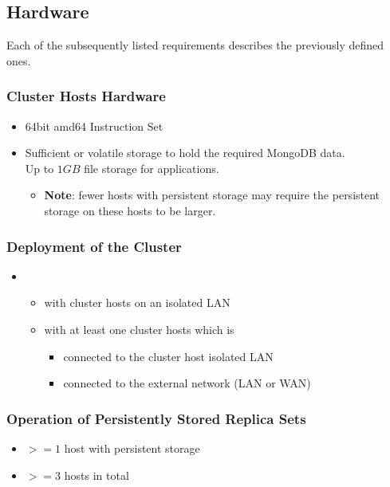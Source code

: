 \documentclass[a4paper, 11pt]{article}
\begin{document}
\subsection{Hardware}

Each of the subsequently listed requirements describes the previously defined ones.

\subsubsection{Cluster Hosts Hardware}
\begin{itemize}
	\item 64bit amd64 Instruction Set
	\item Sufficient  or \gls{volatile storage} to hold the required \gls{MongoDB} data. \\
	      Up to $1GB$ file storage for \mamid applications.
	\begin{itemize}
		\item \textbf{Note}: fewer \glspl{host} with \gls{persistent storage} may require the \gls{persistent storage} on these \glspl{host} to be larger.
	\end{itemize}
\end{itemize}

\subsubsection{Deployment of the Cluster}
\begin{itemize}
	\item {}
	\begin{itemize}
		\item with \gls{cluster} \glspl{host} on an isolated \acrshort{LAN}
		\item with at least one \gls{cluster} \glspl{host} which is
		\begin{itemize}
			\item connected to the \gls{cluster} \gls{host} isolated \acrshort{LAN}
			\item connected to the external network (\acrshort{LAN} or \acrshort{WAN})
		\end{itemize}
	\end{itemize}
\end{itemize}

\subsubsection{Operation of Persistently Stored Replica Sets}
\begin{itemize}
	\item $>= 1$ \gls{host} with \gls{persistent storage}
	\item $>= 3$ \glspl{host} in total
\end{itemize}
\end{document}
